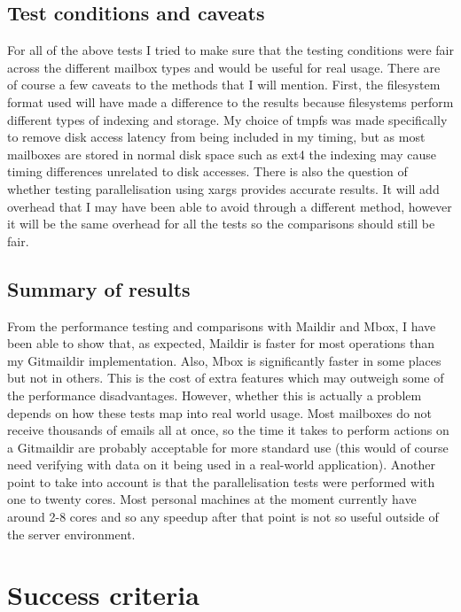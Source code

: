 \subsection{Test conditions and caveats}

For all of the above tests I tried to make sure that the testing conditions were fair across the different mailbox types and would be useful for real usage. There are of course a few caveats to the methods that I will mention. First, the filesystem format used will have made a difference to the results because filesystems perform different types of indexing and storage. My choice of tmpfs was made specifically to remove disk access latency from being included in my timing, but as most mailboxes are stored in normal disk space such as ext4 the indexing may cause timing differences unrelated to disk accesses. There is also the question of whether testing parallelisation using xargs provides accurate results. It will add overhead that I may have been able to avoid through a different method, however it will be the same overhead for all the tests so the comparisons should still be fair.

\subsection{Summary of results}

From the performance testing and comparisons with Maildir and Mbox, I have been able to show that, as expected, Maildir is faster for most operations than my Gitmaildir implementation. Also, Mbox is significantly faster in some places but not in others. This is the cost of extra features which may outweigh some of the performance disadvantages. However, whether this is actually a problem depends on how these tests map into real world usage. Most mailboxes do not receive thousands of emails all at once, so the time it takes to perform actions on a Gitmaildir are probably acceptable for more standard use (this would of course need verifying with data on it being used in a real-world application). Another point to take into account is that the parallelisation tests were performed with one to twenty cores. Most personal machines at the moment currently have around 2-8 cores and so any speedup after that point is not so useful outside of the server environment.

\section{Success criteria}

